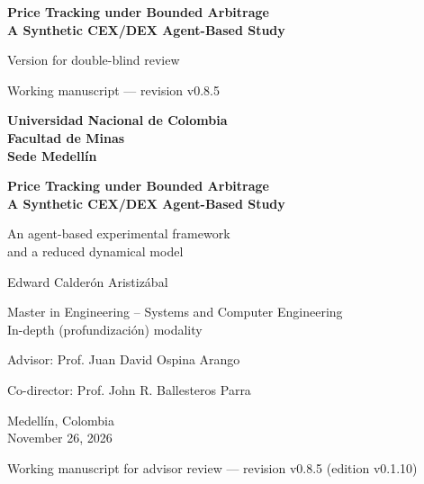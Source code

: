 \documentclass[11pt,letterpaper]{report}
\newcommand{\versionTesis}{v0.1.10}
\newcommand{\revisionManuscrito}{v0.8.5}
\numberwithin{equation}{chapter}
\begin{document}
\begin{titlepage}
  \thispagestyle{empty}
  \centering
  \singlespacing
  \ifdefined\blindreviewmode
  \vspace*{4cm}
  {\LARGE\bfseries Price Tracking under Bounded Arbitrage\\
  A Synthetic CEX/DEX Agent-Based Study\par}
  \vspace{1.2cm}
  {\Large Version for double-blind review\par}
  \vfill
  {\small Working manuscript --- revision \revisionManuscrito{}\par}
  \else
  {\large\bfseries Universidad Nacional de Colombia\\[2pt]
  Facultad de Minas\\[2pt]
  Sede Medellín\par}
  \vspace{3.2cm}
  {\LARGE\bfseries Price Tracking under Bounded Arbitrage\\
  A Synthetic CEX/DEX Agent-Based Study\par}
  \vspace{0.9cm}
  {\Large An agent-based experimental framework\\
  and a reduced dynamical model\par}
  \vspace{2.6cm}
  {\Large Edward Calderón Aristizábal\par}
  \vspace{1.6cm}
  {\large Master in Engineering -- Systems and Computer Engineering\\[2pt]
  In-depth (profundización) modality\par}
  \vspace{0.8cm}
  {\large Advisor: Prof. Juan David Ospina Arango\par}
  {\large Co-director: Prof. John R. Ballesteros Parra\par}
  \vfill
  {\large Medellín, Colombia\\[2pt]
  November 26, 2026\par}
  \vspace{0.3cm}
  {\small Working manuscript for advisor review --- revision \revisionManuscrito{} (edition \versionTesis{})\par}
  \fi
\end{titlepage}

\setcounter{page}{1}
\end{document}
